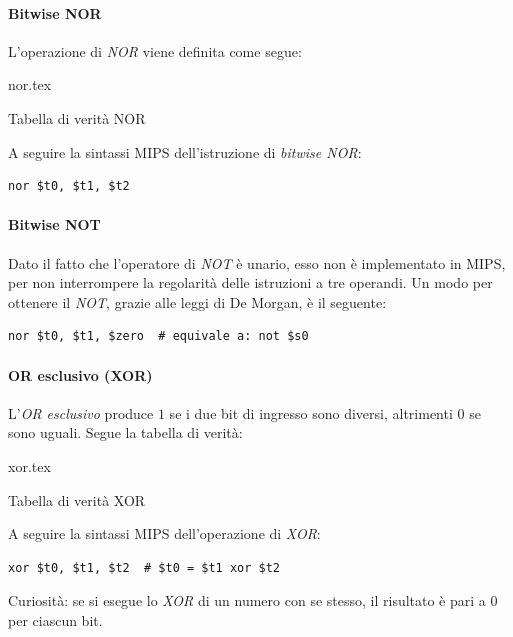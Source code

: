 \documentclass[class=book, crop=false]{standalone}
\begin{document}
\paragraph{Bitwise NOR}
L'operazione di \emph{NOR} viene definita come segue:
\begin{table}[H]
	\centering
	{nor.tex}
	\caption{Tabella di verità NOR}
\end{table}

A seguire la sintassi MIPS dell'istruzione di \emph{bitwise NOR}:
\begin{verbatim}
nor $t0, $t1, $t2
\end{verbatim}

\paragraph{Bitwise NOT}
Dato il fatto che l'operatore di \emph{NOT} è unario, esso non è implementato in MIPS, per non interrompere la regolarità delle istruzioni a tre operandi. Un modo per ottenere il \emph{NOT}, grazie alle leggi di De Morgan, è il seguente:
\begin{verbatim}
nor $t0, $t1, $zero  # equivale a: not $s0
\end{verbatim}

\paragraph{OR esclusivo (XOR)}
L'\emph{OR esclusivo} produce \(1\) se i due bit di ingresso sono diversi, altrimenti \(0\) se sono uguali. Segue la tabella di verità:
\begin{table}[H]
	\centering
	{xor.tex}
	\caption{Tabella di verità XOR}
\end{table}

A seguire la sintassi MIPS dell'operazione di \emph{XOR}:
\begin{verbatim}
xor $t0, $t1, $t2  # $t0 = $t1 xor $t2
\end{verbatim}

Curiosità: se si esegue lo \emph{XOR} di un numero con se stesso, il risultato è pari a \(0\) per ciascun bit.
\end{document}
